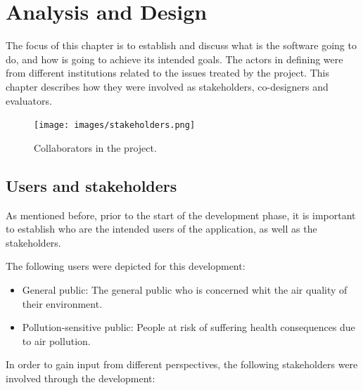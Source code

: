 \chapter{Analysis and Design}
The focus of this chapter is to establish and discuss what is the software going to do, and how is going to achieve its intended goals. The actors in defining were from different institutions related to the issues treated by the project. This chapter describes how they were involved as stakeholders, co-designers and evaluators. 

\begin{figure}[h]
\begin{adjustbox}{width=1\textwidth,center=\textwidth}
  \centering
  \texttt{[image: images/stakeholders.png]}
\end{adjustbox}
  \caption[Colaborators in the project]{Collaborators in the project.}
  \label{fig:stakeholders}
\end{figure}


\section{Users and stakeholders}
As mentioned before, prior to the start of the development phase, it is important to establish who are the intended users of the application, as well as the stakeholders. 

The following users were depicted for this development:

\begin{itemize}
	\item General public: The general public who is concerned whit the air quality of their environment.
    \item Pollution-sensitive public: People at risk of suffering health consequences due to air pollution.
\end{itemize}

In order to gain input from different perspectives, the following stakeholders were involved through the development: 

